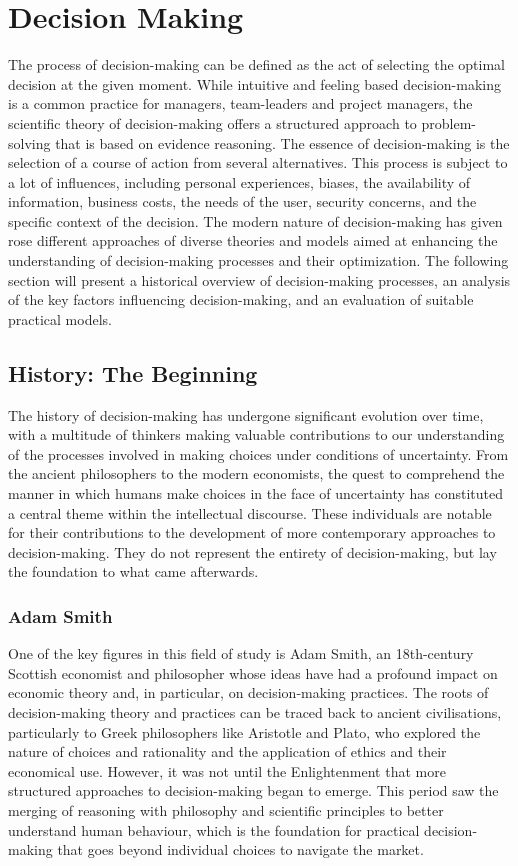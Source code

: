 \chapter{Decision Making}
\vspace{-0.5cm}
The process of decision-making can be defined as the act of selecting the optimal decision at the given moment. While intuitive and feeling based decision-making is a common practice for managers, team-leaders and project managers, the scientific theory of decision-making offers a structured approach to problem-solving that is based on evidence reasoning.
The essence of decision-making is the selection of a course of action from several alternatives. This process is subject to a lot of influences, including personal experiences, biases, the availability of information, business costs, the needs of the user, security concerns, and the specific context of the decision. The modern nature of decision-making has given rose different approaches of diverse theories and models aimed at enhancing the understanding of decision-making processes and their optimization.
The following section will present a historical overview of decision-making processes, an analysis of the key factors influencing decision-making, and an evaluation of suitable practical models.

\section{History: The Beginning}
The history of decision-making has undergone significant evolution over time, with a multitude of thinkers making valuable contributions to our understanding of the processes involved in making choices under conditions of uncertainty. From the ancient philosophers to the modern economists, the quest to comprehend the manner in which humans make choices in the face of uncertainty has constituted a central theme within the intellectual discourse. These individuals are notable for their contributions to the development of more contemporary approaches to decision-making. They do not represent the entirety of decision-making, but lay the foundation to what came afterwards. 
 
\subsection{Adam Smith}
One of the key figures in this field of study is Adam Smith, an 18th-century Scottish economist and philosopher whose ideas have had a profound impact on economic theory and, in particular, on decision-making practices.
\newline \noindent The roots of decision-making theory and practices can be traced back to ancient civilisations, particularly to Greek philosophers like Aristotle and Plato, who explored the nature of choices and rationality and the application of ethics and their economical use. However, it was not until the Enlightenment that more structured approaches to decision-making began to emerge. This period saw the merging of reasoning with philosophy and scientific principles to better understand human behaviour, which is the foundation for practical decision-making that goes beyond individual choices to navigate the market.

